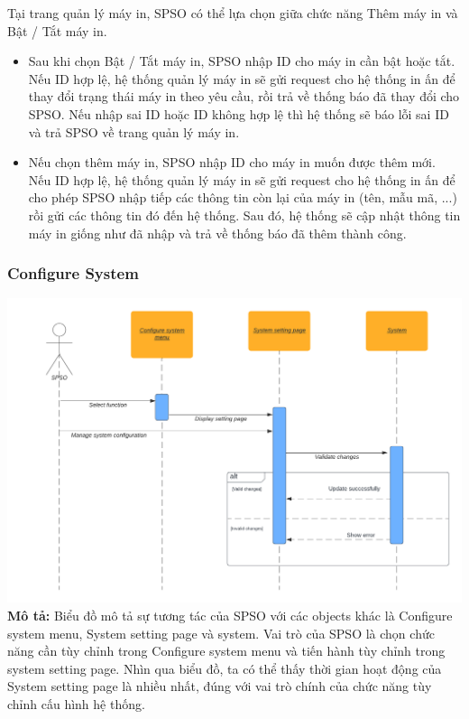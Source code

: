     Tại trang quản lý máy in, SPSO có thể lựa chọn giữa chức năng Thêm máy in và Bật / Tắt máy in. 
    \begin{itemize}
        \item Sau khi chọn Bật / Tắt máy in, SPSO nhập ID cho máy in cần bật hoặc tắt. Nếu ID hợp lệ, hệ thống quản lý máy in sẽ gửi request cho hệ thống in ấn để thay đổi trạng thái máy in theo yêu cầu, rồi trả về thống báo đã thay đổi cho SPSO. Nếu nhập sai ID hoặc ID không hợp lệ thì hệ thống sẽ báo lỗi sai ID và trả SPSO về trang quản lý máy in.
        \item Nếu chọn thêm máy in, SPSO nhập ID cho máy in muốn được thêm mới. Nếu ID hợp lệ, hệ thống quản lý máy in sẽ gửi request cho hệ thống in ấn để cho phép SPSO nhập tiếp các thông tin còn lại của máy in (tên, mẫu mã, ...) rồi gửi các thông tin đó đến hệ thống. Sau đó, hệ thống sẽ cập nhật thông tin máy in giống như đã nhập và trả về thống báo đã thêm thành công.
    \end{itemize}


    \newpage
    \subsubsection{Configure System}
    \includegraphics[width=\textwidth]{images/Task2/SequenceDiagrams/ConfigureSystem_SequenceDiagram.png}
    \textbf{Mô tả:}
    Biểu đồ mô tả sự tương tác của SPSO với các objects khác là Configure system menu, System setting page và system. Vai trò của SPSO là chọn chức năng cần tùy chỉnh trong Configure system menu và tiến hành tùy chỉnh trong system setting page. Nhìn qua biểu đồ, ta có thể thấy thời gian hoạt động của System setting page là nhiều nhất, đúng với vai trò chính của chức năng tùy chỉnh cấu hình hệ thống.\\

